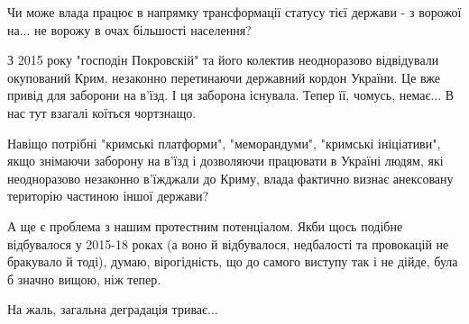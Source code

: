 Чи може влада працює в напрямку трансформації статусу тієї держави - з ворожої
на... не ворожу в очах більшості населення?

З 2015 року "господін Покровскій" та його колектив неодноразово відвідували
окупований Крим, незаконно перетинаючи державний кордон України. Це вже привід
для заборони на в'їзд. І ця заборона існувала. Тепер її, чомусь, немає... В нас
тут взагалі коїться чортзнащо. 

Навіщо потрібні "кримські платформи", "меморандуми", "кримські ініціативи",
якщо знімаючи заборону на в'їзд і дозволяючи працювати в Україні людям, які
неодноразово незаконно в'їжджали до Криму,  влада фактично визнає анексовану
територію частиною іншої держави?

А ще є проблема з нашим протестним потенціалом. Якби щось подібне відбувалося у
2015-18 роках (а воно й відбувалося, недбалості та провокацій не бракувало й
тоді), думаю, вірогідність, що до самого виступу так і не дійде, була б значно
вищою, ніж тепер.

На жаль, загальна деградація триває...

